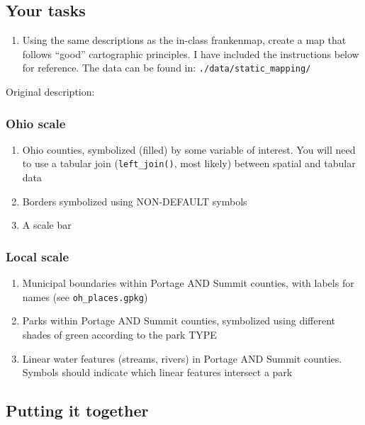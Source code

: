 \documentclass[]{article}
\providecommand{\tightlist}{%
  \setlength{\itemsep}{0pt}\setlength{\parskip}{0pt}}
\begin{document}
\subsection{Your tasks}\label{your-tasks}

\begin{enumerate}
\def\labelenumi{\arabic{enumi}.}
\tightlist
\item
  Using the same descriptions as the in-class frankenmap, create a map
  that follows ``good'' cartographic principles. I have included the
  instructions below for reference. The data can be found in:
  \texttt{./data/static\_mapping/}
\end{enumerate}

Original description:

\subsubsection{Ohio scale}\label{ohio-scale}

\begin{enumerate}
\def\labelenumi{\arabic{enumi}.}
\tightlist
\item
  Ohio counties, symbolized (filled) by some variable of interest. You
  will need to use a tabular join (\texttt{left\_join()}, most likely)
  between spatial and tabular data
\item
  Borders symbolized using NON-DEFAULT symbols
\item
  A scale bar
\end{enumerate}

\subsubsection{Local scale}\label{local-scale}

\begin{enumerate}
\def\labelenumi{\arabic{enumi}.}
\tightlist
\item
  Municipal boundaries within Portage AND Summit counties, with labels
  for names (see \texttt{oh\_places.gpkg})
\item
  Parks within Portage AND Summit counties, symbolized using different
  shades of green according to the park TYPE
\item
  Linear water features (streams, rivers) in Portage AND Summit
  counties. Symbols should indicate which linear features intersect a
  park
\end{enumerate}

\subsection{Putting it together}\label{putting-it-together}
\end{document}

